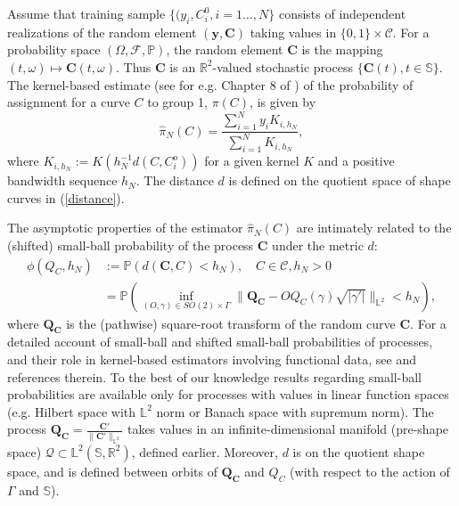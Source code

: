 \documentclass[11pt]{amsart}
\newcommand{\Rtwo}{\mathbb{R}^2}
\newcommand{\ltwo}{\mathbb{L}^2}
\newcommand{\uc}{\mathbb{S}}
\theoremstyle{definition}
\begin{document}
Assume that training sample $\{(y_i,C^0_i,i=1\ldots,N\}$ consists of independent realizations of the random element $(\mathbf{y},\mathbf{C})$ taking values in $\{0,1\}\times \mathcal{C}$. For a probability space $(\Omega,\mathcal{F},\mathbb{P})$, the random element $\mathbf{C}$ is the mapping $(t,\omega)\mapsto \mathbf{C}(t,\omega)$. Thus $\mathbf{C}$ is an $\Rtwo$-valued stochastic process $\{\mathbf{C}(t), t \in \uc\}$. The kernel-based estimate (see for e.g. Chapter 8 of \cite{FV}) of the probability of assignment for a curve $C$ to group 1, $\pi(C)$, is given by
\begin{equation}
\label{prob}
\hat{\pi}_N(C)=\frac{\sum_{i=1}^Ny_iK_{i,h_N}}{\sum_{i=1}^N K_{i,h_N}},
\end{equation} 
where $K_{i,h_N}:=K(h_N^{-1}d(C,C_i^o))$ for a given kernel $K$ and a positive bandwidth sequence $h_N$. The distance $d$ is defined on the quotient space of shape curves in (\ref{distance}).

The asymptotic properties of the estimator $\hat{\pi}_N(C)$ are intimately related to the (shifted) small-ball probability of the process $\mathbf{C}$ under the metric $d$: 
\begin{align*}
\phi(Q_C,h_N)&:=\mathbb{P}(d(\mathbf{C},C) < h_N), \quad C \in \mathcal{C}, h_N>0 \\
&=\mathbb{P}\left(\inf_{(O,\gamma) \in SO(2) \times \Gamma}\|\mathbf{Q_C}-OQ_{C}(\gamma)\sqrt{|\gamma'|}\|_{\ltwo}<h_N\right),
\end{align*}
where $\mathbf{Q_C}$ is the (pathwise) square-root transform of the random curve $\mathbf{C}$. For a detailed account of small-ball and shifted small-ball probabilities of processes, and their role in kernel-based estimators involving functional data, see \cite{FV, CR, AM, WL} and references therein. To the best of our knowledge results regarding small-ball probabilities are available only for processes with values in linear function spaces (e.g. Hilbert space with $\mathbb{L}^2$ norm or Banach space with supremum norm). The process $\mathbf{Q_C}=\frac{\mathbf{C'}}{\|\mathbf{C}'\|_{\ltwo}}$ takes values in an infinite-dimensional manifold (pre-shape space) $\mathcal{Q} \subset \mathbb{L}^2(\uc,\Rtwo)$, defined earlier. Moreover, $d$ is on the quotient shape space, and is defined between orbits of $\mathbf{Q_C}$ and $Q_C$ (with respect to the action of $\Gamma$ and $\uc$). 
\end{document}
